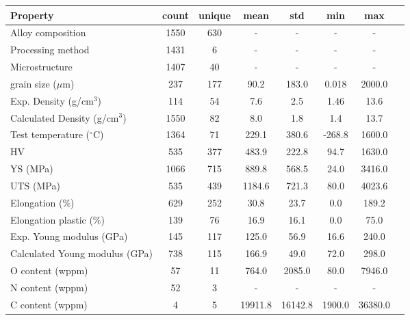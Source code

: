 \begin{tabular}{lccccccc}
\toprule
Property & count & unique & mean & std & min & max \\
\midrule
Alloy composition & 1550 & 630 & - & - & - & - \\
Processing method & 1431 & 6 & - & - & - & - \\
Microstructure & 1407 & 40 & - & - & - & - \\
grain size ($\mu$m) & 237 & 177 & 90.2 & 183.0 & 0.018 & 2000.0 \\
Exp. Density (g/cm$^3$) & 114 & 54 & 7.6 & 2.5 & 1.46 & 13.6 \\
Calculated Density (g/cm$^3$) & 1550 & 82 & 8.0 & 1.8 & 1.4 & 13.7 \\
Test temperature ($^\circ$C) & 1364 & 71 & 229.1 & 380.6 & -268.8 & 1600.0 \\
HV & 535 & 377 & 483.9 & 222.8 & 94.7 & 1630.0 \\
YS (MPa) & 1066 & 715 & 889.8 & 568.5 & 24.0 & 3416.0 \\
UTS (MPa) & 535 & 439 & 1184.6 & 721.3 & 80.0 & 4023.6 \\
Elongation (\%) & 629 & 252 & 30.8 & 23.7 & 0.0 & 189.2 \\
Elongation plastic (\%) & 139 & 76 & 16.9 & 16.1 & 0.0 & 75.0 \\
Exp. Young modulus (GPa) & 145 & 117 & 125.0 & 56.9 & 16.6 & 240.0 \\
Calculated Young modulus (GPa) & 738 & 115 & 166.9 & 49.0 & 72.0 & 298.0 \\
O content (wppm) & 57 & 11 & 764.0 & 2085.0 & 80.0 & 7946.0 \\
N content (wppm) & 52 & 3 & - & - & - & - \\
C content (wppm) & 4 & 5 & 19911.8 & 16142.8 & 1900.0 & 36380.0 \\
\bottomrule
\end{tabular}
